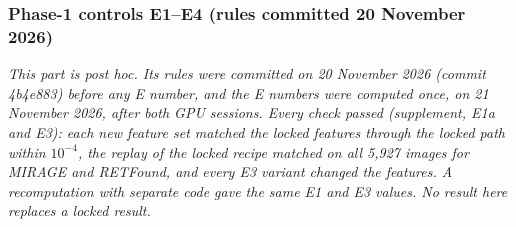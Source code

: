\documentclass[conference]{IEEEtran}
\begin{document}
\subsubsection{Phase-1 controls E1--E4 (rules committed 20 November 2026)}
\label{sec:res-phase1}
\emph{This part is post hoc. Its rules were committed on 20 November 2026 (commit 4b4e883) before any E number, and the E numbers were computed once, on 21 November 2026, after both GPU sessions. Every check passed (supplement, E1a and E3): each new feature set matched the locked features through the locked path within $10^{-4}$, the replay of the locked recipe matched on all 5,927 images for MIRAGE and RETFound, and every E3 variant changed the features. A recomputation with separate code gave the same E1 and E3 values. No result here replaces a locked result.}
\end{document}

